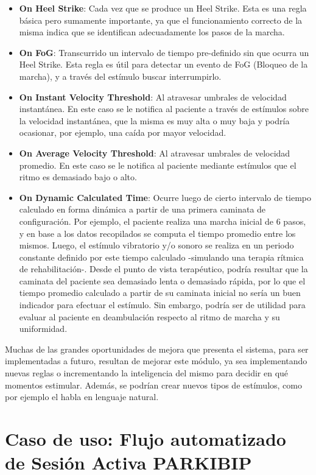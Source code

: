 \begin{itemize}
    \item \textbf{On Heel Strike}: Cada vez que se produce un Heel Strike. Esta es una regla básica pero sumamente importante, ya que el funcionamiento correcto de la misma indica que se identifican adecuadamente los pasos de la marcha.
    \item \textbf{On FoG}: Transcurrido un intervalo de tiempo pre-definido sin que ocurra un Heel Strike. Esta regla es útil para detectar un evento de FoG (Bloqueo de la marcha), y a través del estímulo buscar interrumpirlo. 
    \item \textbf{On Instant Velocity Threshold}: Al atravesar umbrales de velocidad instantánea. En este caso se le notifica al paciente a través de estímulos sobre la velocidad instantánea, que la misma es muy alta o muy baja y podría ocasionar, por ejemplo, una caída por mayor velocidad.  
    \item \textbf{On Average Velocity Threshold}: Al atravesar umbrales de velocidad promedio. En este caso se le notifica al paciente mediante estímulos que el ritmo es demasiado bajo o alto. 
    \item \textbf{On Dynamic Calculated Time}: Ocurre luego de cierto intervalo de tiempo calculado en forma dinámica a partir de una primera caminata de configuración. Por ejemplo, el paciente realiza una marcha inicial de 6 pasos, y en base a los datos recopilados se computa el tiempo promedio entre los mismos. Luego, el estímulo vibratorio y/o sonoro se realiza en un periodo constante definido por este tiempo calculado -simulando una terapia rítmica de rehabilitación-. Desde el punto de vista terapéutico, podría resultar que la caminata del paciente sea demasiado lenta o demasiado rápida, por lo que el tiempo promedio calculado a partir de su caminata inicial no sería un buen indicador para efectuar el estímulo. Sin embargo, podría ser de utilidad para evaluar al paciente en deambulación respecto al ritmo de marcha y su uniformidad. 
\end{itemize}

Muchas de las grandes oportunidades de mejora que presenta el sistema, para ser implementadas a futuro, resultan de mejorar este módulo, ya sea implementando nuevas reglas o incrementando la inteligencia del mismo para decidir en qué momentos estimular. Además, se podrían crear nuevos tipos de estímulos, como por ejemplo el habla en lenguaje natural.

\section{Caso de uso: Flujo automatizado de Sesión Activa PARKIBIP}
\label{section:session-flow}

